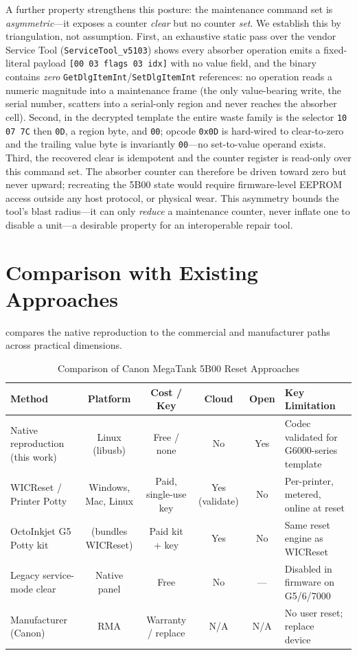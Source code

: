 \documentclass[conference]{IEEEtran}
\begin{document}
A further property strengthens this posture: the maintenance command set is
\emph{asymmetric}---it exposes a counter \emph{clear} but no counter
\emph{set}. We establish this by triangulation, not assumption. First, an
exhaustive static pass over the vendor Service Tool
(\texttt{ServiceTool\_v5103}) shows every absorber operation emits a
fixed-literal payload \texttt{[00 03 flags 03 idx]} with no value field, and the
binary contains \emph{zero} \texttt{GetDlgItemInt}/\texttt{SetDlgItemInt}
references: no operation reads a numeric magnitude into a maintenance frame (the
only value-bearing write, the serial number, scatters into a serial-only region
and never reaches the absorber cell). Second, in the decrypted template the
entire waste family is the selector \texttt{10 07 7C} then \texttt{0D}, a region
byte, and \texttt{00}; opcode \texttt{0x0D} is hard-wired to clear-to-zero and
the trailing value byte is invariantly \texttt{00}---no set-to-value operand
exists. Third, the recovered clear is idempotent and the counter register is
read-only over this command set. The absorber counter can therefore be driven
toward zero but never upward; recreating the 5B00 state would require
firmware-level EEPROM access outside any host protocol, or physical wear. This
asymmetry bounds the tool's blast radius---it can only \emph{reduce} a
maintenance counter, never inflate one to disable a unit---a desirable property
for an interoperable repair tool.

\section{Comparison with Existing Approaches}
\label{sec:comparison}

 compares the native reproduction to the commercial
and manufacturer paths across practical dimensions.

\begin{table}[t]
\centering
\caption{Comparison of Canon MegaTank 5B00 Reset Approaches}
\label{tab:comparison}
\begin{tabular}{@{}lccccl@{}}
\toprule
Method & Platform & Cost / Key & Cloud & Open & Key Limitation \\
\midrule
Native reproduction (this work) & Linux (libusb) & Free / none & No & Yes &
  Codec validated for G6000-series template \\
WICReset / Printer Potty~\cite{octoinkjet-wicreset} & Windows, Mac, Linux & Paid, single-use key & Yes (validate) & No &
  Per-printer, metered, online at reset \\
OctoInkjet G5 Potty kit~\cite{octoinkjet-wicreset} & (bundles WICReset) & Paid kit + key & Yes & No &
  Same reset engine as WICReset \\
Legacy service-mode clear & Native panel & Free & No & --- &
  Disabled in firmware on G5/6/7000 \\
Manufacturer (Canon) & RMA & Warranty / replace & N/A & N/A &
  No user reset; replace device~\cite{canon-5b00-support} \\
\bottomrule
\end{tabular}
\end{table}
\end{document}
